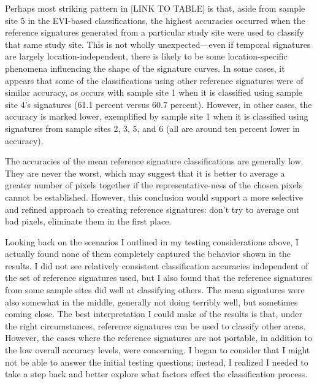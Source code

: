 Perhaps most striking pattern in [LINK TO TABLE] is that, aside from sample site 5 in the EVI-based classifications, the highest accuracies occurred when the reference signatures generated from a particular study site were used to classify that same study site. This is not wholly unexpected—even if temporal signatures are largely location-independent, there is likely to be some location-specific phenomena influencing the shape of the signature curves. In some cases, it appears that some of the classifications using other reference signatures were of similar accuracy, as occurs with sample site 1 when it is classified using sample site 4’s signatures (61.1 percent versus 60.7 percent). However, in other cases, the accuracy is marked lower, exemplified by sample site 1 when it is classified using signatures from sample sites 2, 3, 5, and 6 (all are around ten percent lower in accuracy).

The accuracies of the mean reference signature classifications are generally low. They are never the worst, which may suggest that it is better to average a greater number of pixels together if the representative-ness of the chosen pixels cannot be established. However, this conclusion would support a more selective and refined approach to creating reference signatures: don’t try to average out bad pixels, eliminate them in the first place.

Looking back on the scenarios I outlined in my testing considerations above, I actually found none of them completely captured the behavior shown in the results. I did not see relatively consistent classification accuracies independent of the set of reference signatures used, but I also found that the reference signatures from some sample sites did well at classifying others. The mean signatures were also somewhat in the middle, generally not doing terribly well, but sometimes coming close. The best interpretation I could make of the results is that, under the right circumstances, reference signatures can be used to classify other areas. However, the cases where the reference signatures are not portable, in addition to the low overall accuracy levels, were concerning. I began to consider that I might not be able to answer the initial testing questions; instead, I realized I needed to take a step back and better explore what factors effect the classification process.

